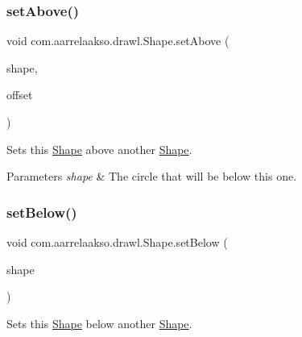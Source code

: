 \subsubsection{\texorpdfstring{set\+Above()}{setAbove()}\hspace{0.1cm}{\footnotesize\ttfamily [2/2]}}
{\footnotesize\ttfamily void com.\+aarrelaakso.\+drawl.\+Shape.\+set\+Above (\begin{DoxyParamCaption}\item[{@Not\+Null \hyperlink{classcom_1_1aarrelaakso_1_1drawl_1_1_shape}{Shape}}]{shape,  }\item[{@Not\+Null \hyperlink{classcom_1_1aarrelaakso_1_1drawl_1_1_measure}{Measure}}]{offset }\end{DoxyParamCaption})\hspace{0.3cm}{\ttfamily [inherited]}}



Sets this \hyperlink{classcom_1_1aarrelaakso_1_1drawl_1_1_shape}{Shape} above another \hyperlink{classcom_1_1aarrelaakso_1_1drawl_1_1_shape}{Shape}. 


\begin{DoxyParams}{Parameters}
{\em shape} & The circle that will be below this one. \\
\hline
\end{DoxyParams}
\mbox{\label{classcom_1_1aarrelaakso_1_1drawl_1_1_shape_aabbe6165d905a690a38917443bf6e5b5}} 
\subsubsection{\texorpdfstring{set\+Below()}{setBelow()}\hspace{0.1cm}{\footnotesize\ttfamily [1/2]}}
{\footnotesize\ttfamily void com.\+aarrelaakso.\+drawl.\+Shape.\+set\+Below (\begin{DoxyParamCaption}\item[{@Not\+Null \hyperlink{classcom_1_1aarrelaakso_1_1drawl_1_1_shape}{Shape}}]{shape }\end{DoxyParamCaption})\hspace{0.3cm}{\ttfamily [inherited]}}



Sets this \hyperlink{classcom_1_1aarrelaakso_1_1drawl_1_1_shape}{Shape} below another \hyperlink{classcom_1_1aarrelaakso_1_1drawl_1_1_shape}{Shape}. 


